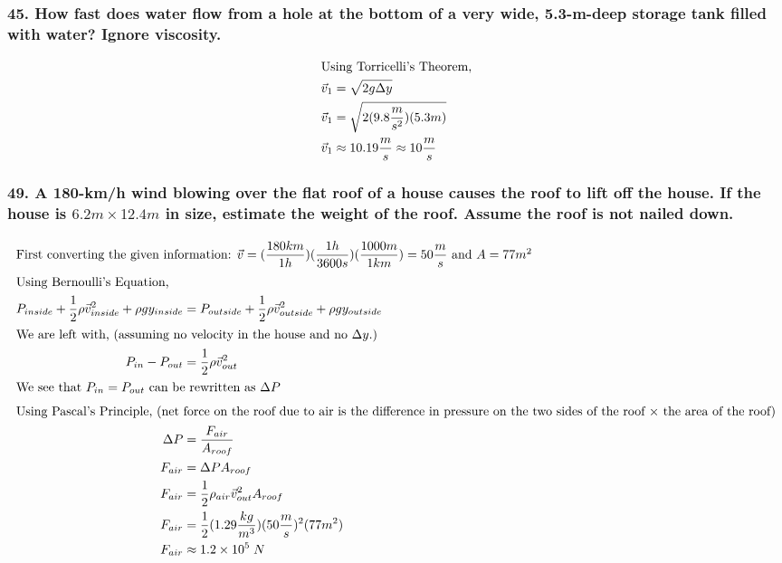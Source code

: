 \documentclass{article}
\begin{document}
\subsubsection*{
    45. How fast does water flow from a hole at the bottom of a very wide,
    5.3-m-deep storage tank filled with water? Ignore viscosity.
}
\begin{align*}
    \intertext{Using Torricelli's Theorem,}
    \vec v_1 &= \sqrt{2g\Delta y} \\
    \vec v_1 &= \sqrt{2(9.8 \displaystyle\frac{m}{s^2})(5.3m)} \\
    \vec v_1 &\approx 10.19 \frac m s \approx 10 \frac m s
\end{align*}
\subsubsection*{
    49. A 180-km/h wind blowing over the flat roof of a house causes the roof
    to lift off the house. If the house is $6.2 m \times 12.4m$ in size,
    estimate the weight of the roof. Assume the roof is not nailed down.
}
\begin{align*}
    \intertext{First converting the given information: $\vec v =
    (\displaystyle\frac{180km}{1h})(\displaystyle\frac{1h}{3600s})(\displaystyle\frac{1000m}{1km}) = 50 \frac m s$ and $A = 77m^2$}
    \intertext{Using Bernoulli's Equation,}
    P_{inside} + \frac 1 2 \rho\vec v_{inside}^2 + \rho gy_{inside} &=
    P_{outside} + \frac 1 2 \rho\vec v_{outside}^2 + \rho gy_{outside} \\
    \intertext{We are left with, (assuming no velocity in the house and no
    $\Delta y$.)}
    P_{in} - P_{out} &= \frac 1 2 \rho\vec v_{out}^2 \\
    \intertext{We see that $P_{in} = P_{out}$ can be rewritten as $\Delta P$}
    \intertext{Using Pascal's Principle, (net force on the roof due to air is
    the difference in pressure on the two sides of the roof $\times$ the area of
the roof)}
    \Delta P &= \displaystyle\frac{F_{air}}{A_{roof}} \\
    F_{air} &= \Delta P A_{roof} \\
    F_{air} &= \frac 1 2 \rho_{air}\vec v_{out}^2 A_{roof} \\
    F_{air} &= \frac 1 2 (1.29\frac{kg}{m^3})(50\frac m s)^2(77m^2) \\
    F_{air} &\approx 1.2 \times 10^5\;N
\end{align*}
\end{document}
